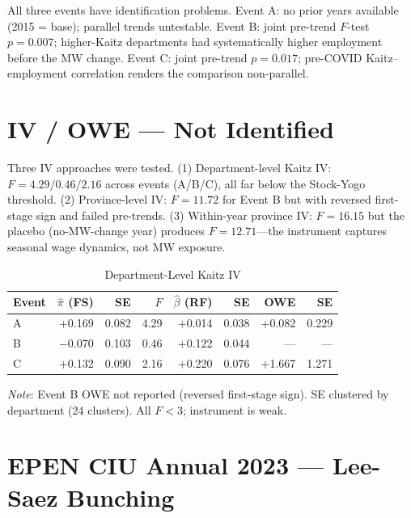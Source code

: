 \documentclass[12pt]{article}
\begin{document}
\begin{appendices}
All three events have identification problems. Event A: no prior years available (2015 = base); parallel trends untestable. Event B: joint pre-trend $F$-test $p = 0.007$; higher-Kaitz departments had systematically higher employment before the MW change. Event C: joint pre-trend $p = 0.017$; pre-COVID Kaitz--employment correlation renders the comparison non-parallel.

\section{IV / OWE --- Not Identified}\label{app:iv}

Three IV approaches were tested. (1) Department-level Kaitz IV: $F = 4.29 / 0.46 / 2.16$ across events (A/B/C), all far below the Stock-Yogo threshold. (2) Province-level IV: $F = 11.72$ for Event B but with reversed first-stage sign and failed pre-trends. (3) Within-year province IV: $F = 16.15$ but the placebo (no-MW-change year) produces $F = 12.71$---the instrument captures seasonal wage dynamics, not MW exposure.

\begin{table}[H]
\centering
\caption{Department-Level Kaitz IV}
\label{tab:iv}
\begin{threeparttable}
\small
\begin{tabular}{lrrrrrrr}
\toprule
Event & $\hat{\pi}$ (FS) & SE & $F$ & $\hat{\beta}$ (RF) & SE & OWE & SE \\
\midrule
A & +0.169 & 0.082 & 4.29 & +0.014 & 0.038 & +0.082 & 0.229 \\
B & $-$0.070 & 0.103 & 0.46 & +0.122 & 0.044 & --- & --- \\
C & +0.132 & 0.090 & 2.16 & +0.220 & 0.076 & +1.667 & 1.271 \\
\bottomrule
\end{tabular}
\begin{tablenotes}
\small
\item \textit{Note}: Event B OWE not reported (reversed first-stage sign). SE clustered by department (24 clusters). All $F < 3$; instrument is weak.
\end{tablenotes}
\end{threeparttable}
\end{table}

\section{EPEN CIU Annual 2023 --- Lee-Saez Bunching}\label{app:epen}


\end{appendices}
\end{document}
